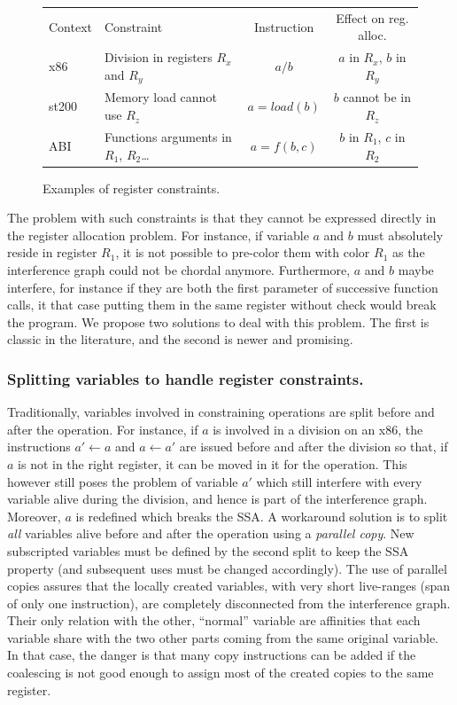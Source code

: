 {\begin{figure}
  \begin{center}
    \begin{tabular}{llcc}
    Context & Constraint  & Instruction & Effect on reg. alloc. \\
    x86 & Division in registers $R_x$ and $R_y$ & $a / b$ & $a$ in $R_x$, $b$ in $R_y$\\
    st200 & Memory load cannot use $R_z$ & $a = load(b)$ & $b$ cannot be in $R_z$\\
    ABI & Functions arguments in $R_1$, $R_2$\ldots & $a = f(b,c)$ & $b$ in $R_1$, 
    $c$ in $R_2$ \\
  \end{tabular}
  \end{center}
  \caption{Examples of register constraints.}
  \label{fig:reg-constraints}
\end{figure}


The problem with such constraints is that they cannot be expressed directly in 
the register allocation problem. For instance, if variable $a$ and $b$ must 
absolutely reside in register $R_1$, it is not possible to pre-color them with 
color $R_1$ as the interference graph could not be chordal anymore.  
Furthermore, $a$ and $b$ maybe interfere, for instance if they are both the 
first parameter of successive function calls, it that case putting them in the 
same register without check would break the program. We propose two solutions 
to deal with this problem. The first is classic in the literature, and the 
second is newer and promising.


\subsubsection{Splitting variables to handle register constraints.}

Traditionally, variables involved in constraining operations are split before 
and after the operation. For instance, if $a$ is involved in a division on an 
x86, the instructions $a'\gets a$ and $a\gets a'$ are issued before and after 
the division so that, if $a$ is not in the right register, it can be moved in 
it for the operation. This however still poses the problem of variable $a'$ 
which still interfere with every variable alive during the division, and hence 
is part of the interference graph. Moreover, $a$ is redefined which breaks the 
SSA. A workaround solution is to split \emph{all} variables alive before and 
after the operation using a \emph{parallel copy}. New subscripted variables 
must be defined by the second split to keep the SSA property (and subsequent 
uses must be changed accordingly). The use of parallel copies assures that 
the locally created variables, with very short live-ranges (span of only one 
instruction), are completely disconnected from the interference graph. Their 
only relation with the other, ``normal'' variable are affinities that each 
variable share with the two other parts coming from the same original variable.
In that case, the danger is that many copy instructions can be added if the 
coalescing is not good enough to assign most of the created copies to the same 
register.


}
